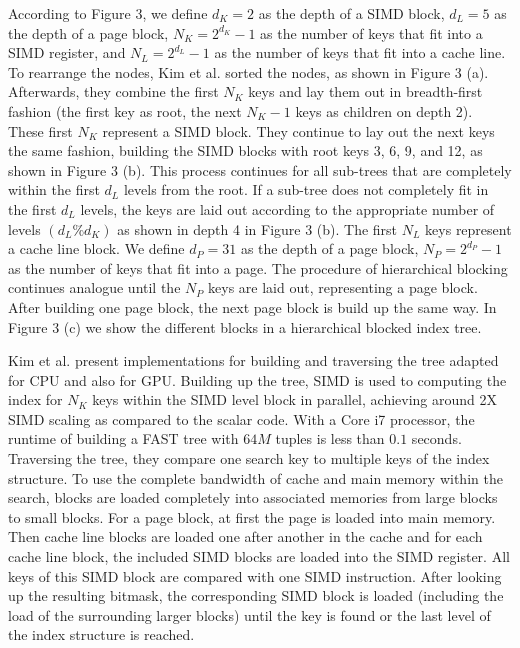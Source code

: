 \documentclass[conference]{IEEEtran}
\begin{document}
According to Figure 3, we define $d_K=2$ as the depth of a SIMD block, $d_L=5$ as the depth of a page block, $N_K=2^{d_K} -1$ as the number of keys that fit into a SIMD register, and $N_L = 2^{d_L} - 1$ as the number of keys that fit into a cache line. To rearrange the nodes, Kim et al. sorted the nodes, as shown in Figure 3 (a). Afterwards, they combine the first $N_K$ keys and lay them out in breadth-first fashion (the first key as root, the next $N_K - 1$ keys as children on depth 2). These first $N_K$ represent a SIMD block. They continue to lay out the next keys the same fashion, building the SIMD blocks with root keys 3, 6, 9, and 12, as shown in Figure 3 (b). This process continues for all sub-trees that are completely within the first $d_L$ levels from the root. If a sub-tree does not completely fit in the first $d_L$ levels, the keys are laid out according to the appropriate number of levels $(d_L \% d_K)$ as shown in depth 4 in Figure 3 (b). The first $N_L$ keys represent a cache line block. We define $d_P=31$ as the depth of a page block, $N_P=2^{d_P} -1$ as the number of keys that fit into a page. The procedure of hierarchical blocking continues analogue until the $N_P$ keys are laid out, representing a page block. After building one page block, the next page block is build up the same way. In Figure 3 (c) we show the different blocks in a hierarchical blocked index tree.

Kim et al. present implementations for building and traversing the tree adapted for CPU and also for GPU. Building up the tree, SIMD is used to computing the index for $N_K$ keys within the SIMD level block in parallel, achieving around 2X SIMD scaling as compared to the scalar code. With a Core i7 processor, the runtime of building a FAST tree with $64M$ tuples is less than $0.1$ seconds. Traversing the tree, they compare one search key to multiple keys of the index structure. To use the complete bandwidth of cache and main memory within the search, blocks are loaded completely into associated memories from large blocks to small blocks. For a page block, at first the page is loaded into main memory. Then cache line blocks are loaded one after another in the cache and for each cache line block, the included SIMD blocks are loaded into the SIMD register. All keys of this SIMD block are compared with one SIMD instruction. After looking up the resulting bitmask, the corresponding SIMD block is loaded (including the load of the surrounding larger blocks) until the key is found or the last level of the index structure is reached.
\end{document}
